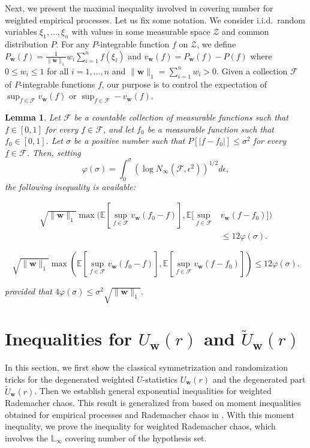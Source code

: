 \documentclass[letterpaper]{article} %
\def\DoubleColumn{}
\def\DoubleColumnEnd{}
\def\SingleColumn{}
\def\SingleColumnEnd{}
\newtheorem{lemma}{Lemma}
\newcommand{\E}{\mathbb{E}}
\newcommand{\Pro}{P}
\newcommand{\weight}{\mathbf{w}}
\newcommand{\lebesgue}{\mathbb{L}}
\newcommand{\normo}[1]{\|#1\|_1}
\begin{document}
Next, we present the maximal inequality involved in covering number for weighted empirical processes. Let us fix some notation. We consider i.i.d.\ random variables $\xi_1,\dots,\xi_n$ with values in some measurable space $\mathcal{Z}$ and common distribution $P$. For any $P$-integrable function $f$ on $\mathcal{Z}$, we define $P_\weight(f)=\frac{1}{\normo{\weight{}}}w_i\sum_{i=1}^nf(\xi_i)$ and $v_\weight(f)=P_\weight(f)-P(f)$ where $0\le w_i\le 1$ for all $i=1,\dots,n$ and $\normo{\weight{}}=\sum_{i=1}^n w_i> 0$. Given a collection $\mathcal{F}$ of $P$-integrable functions $f$, our purpose is to control the expectation of $\sup_{f\in\mathcal{F}}v_\weight(f)$ or $\sup_{f\in\mathcal{F}}-v_\weight(f)$.

\begin{lemma}
\label{le:maximal_entropy_inequality}
    Let $\mathcal{F}$ be a countable collection of measurable functions such that $f\in [0,1]$ for every $f\in\mathcal{F}$, and let $f_0$ be a measurable function such that $f_0\in[0,1]$. Let $\sigma$ be a positive number such that $\Pro[|f-f_0|]\le \sigma^2$ for every $f\in\mathcal{F}$. Then, setting
    \[\varphi(\sigma)=\int_0^{\sigma} (\log N_\infty(\mathcal{F},\epsilon^2))^{1/2}d\epsilon,\]
    the following inequality is available:
    \DoubleColumn
    \begin{align*}
        \sqrt{\normo{\weight{}}}\max(\E[\sup_{f\in\mathcal{F}}v_\weight(f_0-f)],\E[\sup_{f\in\mathcal{F}} &v_\weight(f-f_0)])\\
        &\le 12\varphi(\sigma).
    \end{align*}
    \DoubleColumnEnd
    \SingleColumn
    \[\sqrt{\normo{\weight{}}}\max\left(\E[\sup_{f\in\mathcal{F}}v_\weight(f_0-f)],\E[\sup_{f\in\mathcal{F}} v_\weight(f-f_0)]\right)\le 12\varphi(\sigma).\]
    \SingleColumnEnd
    provided that $4\varphi(\sigma)\le \sigma^2\sqrt{\normo{\weight{}}}$.
\end{lemma}


\section{Inequalities for $U_\weight{}(r)$ and $\widetilde{U}_\weight{}(r)$} %
\label{sec:a_moment_inequality_for_weighted_u_processes}

In this section, we first show the classical symmetrization and randomization tricks for the degenerated weighted $U$-statistics $U_\weight{}(r)$ and the degenerated part $\widetilde{U}_\weight{}(r)$.
Then we establish general exponential inequalities for weighted Rademacher chaos.
This result is generalized from \cite{clemenccon2008ranking} based on moment inequalities obtained for empirical processes and Rademacher chaos in \cite{Boucheron2005}.
With this moment inequality, we prove the inequality for weighted Rademacher chaos, which involves the $\lebesgue{}_\infty$ covering number of the hypothesis set.
\end{document}
